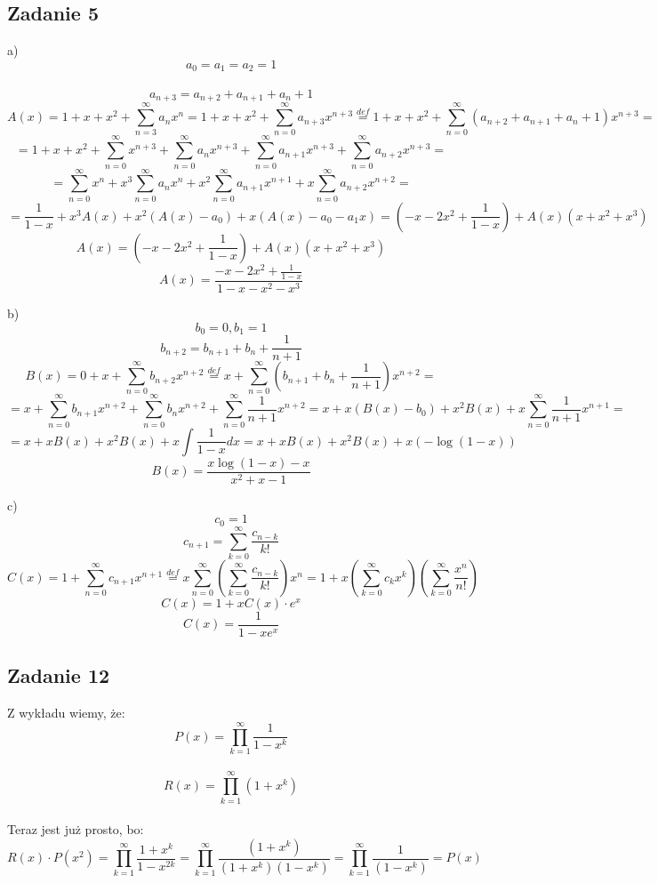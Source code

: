 \documentclass[a4paper]{article}
\begin{document}
\subsection*{Zadanie 5}
a)\\
$$a_0 = a_1 = a_2 = 1 $$\\
$$a_{n+3}=a_{n+2}+a_{n+1}+a_n+1 $$
$$A(x)=1+x+x^2 + \sum_{n=3}^{\infty} a_n x^n = 1+x+x^2 + \sum_{n=0}^{\infty} a_{n+3} x^{n+3} \stackrel{def}{=} 1+x+x^2 + \sum_{n=0}^{\infty} (a_{n+2}+a_{n+1}+a_n+1) x^{n+3} = $$
$$= 1+x+x^2+\sum\limits_{n=0}^{\infty} x^{n+3} + \sum\limits_{n=0}^{\infty}a_n x^{n+3} + \sum\limits_{n=0}^{\infty}a_{n+1} x^{n+3} + \sum\limits_{n=0}^{\infty}a_{n+2} x^{n+3} =$$
$$= \sum\limits_{n=0}^{\infty} x^{n} + x^3\sum\limits_{n=0}^{\infty} a_n x^{n} + x^2\sum\limits_{n=0}^{\infty}a_{n+1} x^{n+1} + x\sum\limits_{n=0}^{\infty} a_{n+2}x^{n+2} =$$
$$= \frac{1}{1-x} + x^3A(x)+x^2(A(x)-a_0)+x(A(x)-a_0-a_1x)=\left(-x-2x^2+\frac{1}{1-x}\right) + A(x)(x+x^2+x^3)$$
$$A(x)=\left(-x-2x^2+\frac{1}{1-x}\right) + A(x)(x+x^2+x^3)$$
$$A(x)=\frac{-x-2x^2+\frac{1}{1-x}}{1-x-x^2-x^3}$$

b)\\
$$b_0=0, b_1=1$$
$$b_{n+2} = b_{n+1} + b_n +\frac{1}{n+1} $$
$$B(x)=0+x+\sum\limits_{n=0}^{\infty} b_{n+2} x^{n+2} \stackrel{def}{=}  x + \sum\limits_{n=0}^{\infty} ( b_{n+1} + b_n + \frac{1}{n+1} ) x^{n+2} = $$
$$= x + \sum\limits_{n=0}^{\infty} b_{n+1} x^{n+2} + \sum\limits_{n=0}^{\infty} b_n x^{n+2} + \sum\limits_{n=0}^{\infty} \frac{1}{n+1} x^{n+2} = x + x(B(x)-b_0) + x^2B(x) + x \sum\limits_{n=0}^{\infty} \frac{1}{n+1} x^{n+1} =$$  
$$= x + xB(x) + x^2B(x) + x\int \frac{1}{1-x} dx = x + xB(x) + x^2B(x) + x(-\log(1-x))$$
$$B(x)=\frac{x\log(1-x)-x}{x^2+x-1}$$

c)\\
$$c_0=1$$ 
$$c_{n+1}=\sum\limits_{k=0}^{\infty} \frac{c_{n-k}}{k!}$$
$$C(x)=1+\sum\limits_{n=0}^{\infty} c_{n+1} x^{n+1} \stackrel{def}{=} x\sum\limits_{n=0}^{\infty} \left(\sum\limits_{k=0}^{\infty} \frac{c_{n-k}}{k!}\right) x^n = 1+x\left(\sum\limits_{k=0}^{\infty} c_k x^k\right)\left(\sum\limits_{k=0}^{\infty} \frac{x^n}{n!}\right)$$
$$C(x)=1+xC(x)\cdot e^x$$
$$C(x)=\frac{1}{1-xe^x}$$

\clearpage

\subsection*{Zadanie 12}
Z wykładu wiemy, że:\\
$$P(x) = \prod_{k=1}^{\infty} \frac 1 {1-x^k}$$\\
$$R(x) = \prod_{k=1}^{\infty} (1+x^k)$$\\
Teraz jest już prosto, bo:\\
$$R(x) \cdot P(x^2) = \prod\limits_{k=1}^{\infty} \frac {1+x^k} {1-x^{2k}} = \prod\limits_{k=1}^{\infty} \frac {(1+x^k)} {(1+x^k)(1-x^k)} = \prod\limits_{k=1}^{\infty} \frac {1} {(1-x^k)} = P(x)$$
\end{document}
